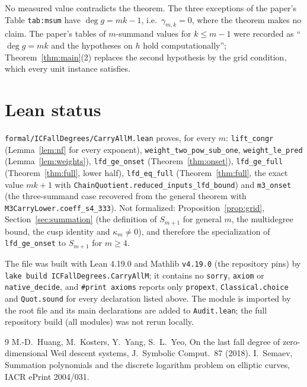 \documentclass[11pt]{article}
\newcommand{\code}[1]{\texttt{#1}}
\theoremstyle{definition}
\theoremstyle{remark}
\begin{document}
No measured value contradicts the theorem. The three exceptions of the
paper's Table \code{tab:msum} have $\deg g=mk-1$, i.e.\ $\gamma_{m,k}=0$, where the
theorem makes no claim. The paper's tables of $m$-summand values for
$k\le m-1$ were recorded as ``$\deg g=mk$ and the hypotheses on $h$ hold
computationally''; Theorem~\ref{thm:main}(2) replaces the second hypothesis by
the grid condition, which every unit instance satisfies.

\section{Lean status}\label{sec:lean}
\code{formal/ICFallDegrees/CarryAllM.lean} proves, for every $m$:
\code{lift\_congr} (Lemma~\ref{lem:nf} for every exponent),
\code{weight\_two\_pow\_sub\_one}, \code{weight\_le\_pred} (Lemma~\ref{lem:weights}),
\code{lfd\_ge\_onset} (Theorem~\ref{thm:onset}), \code{lfd\_ge\_full}
(Theorem~\ref{thm:full}, lower half), \code{lfd\_eq\_full} (Theorem~\ref{thm:full},
the exact value $mk+1$ with \code{ChainQuotient.reduced\_inputs\_lfd\_bound}) and \code{m3\_onset} (the three-summand
case recovered from the general theorem with \code{M3CarryLower.coeff\_s4\_333}).
Not formalized: Proposition~\ref{prop:grid}, Section~\ref{sec:summation}
(the definition of $S_{m+1}$ for general $m$, the multidegree bound, the
cusp identity and $\kappa_m\ne0$), and therefore the specialization of
\code{lfd\_ge\_onset} to $S_{m+1}$ for $m\ge4$.

The file was built with Lean 4.19.0 and Mathlib \code{v4.19.0} (the
repository pins) by \code{lake build ICFallDegrees.CarryAllM}; it contains no
\code{sorry}, \code{axiom} or \code{native\_decide}, and \code{\#print axioms} reports only
\code{propext}, \code{Classical.choice} and \code{Quot.sound} for every
declaration listed above. The module is imported by the root file and its
main declarations are added to \code{Audit.lean}; the full repository build
(all modules) was not rerun locally.

\begin{thebibliography}{9}
 M.-D.~Huang, M.~Kosters, Y.~Yang, S.~L.~Yeo, On the last fall degree of zero-dimensional Weil descent systems, J.~Symbolic Comput.\ 87 (2018).
 I.~Semaev, Summation polynomials and the discrete logarithm problem on elliptic curves, IACR ePrint 2004/031.
\end{thebibliography}
\end{document}
